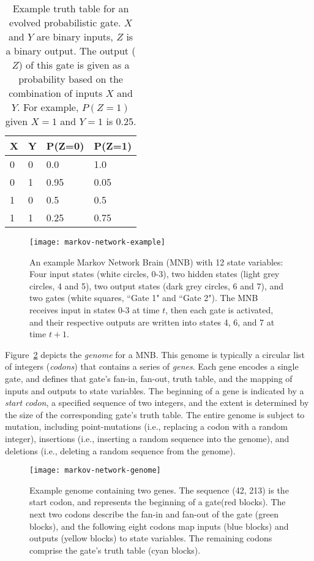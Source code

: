\begin{table}[h]
    \centering
    \caption{Example truth table for an evolved probabilistic gate.  $X$ and $Y$ are binary inputs, $Z$ is a binary output.  The output ($Z$) of this gate is given as a probability based on the combination of inputs $X$ and $Y$.  For example, $P(Z=1)$ given $X=1$ and $Y=1$ is 0.25.}
    \begin{tabular}{ll|ll}
    \hline
        {\bf X} & {\bf Y} & {\bf P(Z=0)} & P(Z=1) \\\hline
        0 & 0 & 0.0 & 1.0\\
        0 & 1 & 0.95 & 0.05\\
        1 & 0 & 0.5 & 0.5\\
        1 & 1 & 0.25 & 0.75\\
        \hline
    \end{tabular}
    \label{t:prob-gate}
\end{table}

\begin{figure}
\centering
\texttt{[image: markov-network-example]}
\caption{An example Markov Network Brain (MNB) with 12 state variables: Four input states (white circles, 0-3), two hidden states (light grey circles, 4 and 5), two output states (dark grey circles, 6 and 7), and two gates (white squares, ``Gate 1" and ``Gate 2"). The MNB receives input in states 0-3 at time $t$, then each gate is activated, and their respective outputs are written into states 4, 6, and 7 at time $t+1$.}
\label{f:mnb-example}
\end{figure}

Figure~\ref{f:mnb-genome} depicts the {\em genome} for a MNB.  This genome is typically a circular list of integers ({\em codons}) that contains a series of {\em genes}.  Each gene encodes a single gate, and defines that gate's fan-in, fan-out, truth table, and the mapping of inputs and outputs to state variables.  The beginning of a gene is indicated by a {\em start codon}, a specified sequence of two integers, and the extent is determined by the size of the corresponding gate's truth table.  The entire genome is subject to mutation, including point-mutations (i.e., replacing a codon with a random integer), insertions (i.e., inserting a random sequence into the genome),  and deletions (i.e., deleting a random sequence from the genome).

\begin{figure}
\centering
\texttt{[image: markov-network-genome]}
\caption{Example genome containing two genes. The sequence (42, 213) is the start codon, and represents the beginning of a gate(red blocks). The next two codons describe the fan-in and fan-out of the gate (green blocks), and the following eight codons map inputs (blue blocks) and outputs (yellow blocks) to state variables.  The remaining codons comprise the gate's truth table (cyan blocks).}
\label{f:mnb-genome}
\end{figure}

